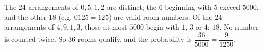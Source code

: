 The $24$ arrangements of $0,5,1,2$ are distinct; the $6$ beginning with $5$ exceed $5000$, and the other $18$ (e.g. $0125=125$) are valid room numbers. Of the $24$ arrangements of $4,9,1,3$, those at most $5000$ begin with $1$, $3$ or $4$: $18$. No number is counted twice. So $36$ rooms qualify, and the probability is $\dfrac{36}{5000}=\boxed{\dfrac9{1250}}$.
